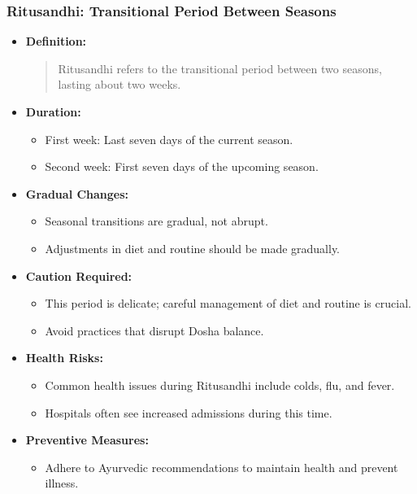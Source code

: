 \begin{frame}[fragile]\frametitle{Ritusandhi: Transitional Period Between Seasons}

      \begin{itemize}
        \item \textbf{Definition:} 
        \begin{quote}
        Ritusandhi refers to the transitional period between two seasons, lasting about two weeks.
        \end{quote}
        \item \textbf{Duration:} 
        \begin{itemize}
            \item First week: Last seven days of the current season.
            \item Second week: First seven days of the upcoming season.
        \end{itemize}
        \item \textbf{Gradual Changes:} 
        \begin{itemize}
            \item Seasonal transitions are gradual, not abrupt.
            \item Adjustments in diet and routine should be made gradually.
        \end{itemize}
        \item \textbf{Caution Required:} 
        \begin{itemize}
            \item This period is delicate; careful management of diet and routine is crucial.
            \item Avoid practices that disrupt Dosha balance.
        \end{itemize}
        \item \textbf{Health Risks:} 
        \begin{itemize}
            \item Common health issues during Ritusandhi include colds, flu, and fever.
            \item Hospitals often see increased admissions during this time.
        \end{itemize}
        \item \textbf{Preventive Measures:} 
        \begin{itemize}
            \item Adhere to Ayurvedic recommendations to maintain health and prevent illness.
        \end{itemize}
      \end{itemize}

\end{frame}


